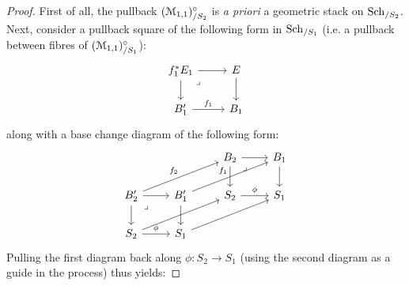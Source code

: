                     \begin{proof}
                        First of all, the pullback $(\mathcal{M}_{1, 1})_{/S_2}^{\circ}$ is \textit{a priori} a geometric stack on $\mathrm{Sch}_{/S_2}$. Next, consider a pullback square of the following form in $\mathrm{Sch}_{/S_1}$ (i.e. a pullback between fibres of $(\mathcal{M}_{1, 1})_{/S_1}^{\circ}$):
                            $$
                                \begin{tikzcd}
                                	{f_1^* E_1} & E \\
                                	{B_1'} & {B_1}
                                	\arrow["{f_1}", from=2-1, to=2-2]
                                	\arrow[from=1-2, to=2-2]
                                	\arrow[from=1-1, to=1-2]
                                	\arrow[from=1-1, to=2-1]
                                	\arrow["\lrcorner"{anchor=center, pos=0.125}, draw=none, from=1-1, to=2-2]
                                \end{tikzcd}
                            $$
                        along with a base change diagram of the following form:
                            $$
                                \begin{tikzcd}
                                	&& {B_2} & {B_1} \\
                                	{B_2'} & {B'_1} & {S_2} & {S_1} \\
                                	{S_2} & {S_1}
                                	\arrow["\phi", from=3-1, to=3-2]
                                	\arrow[from=2-2, to=3-2]
                                	\arrow[from=2-1, to=2-2]
                                	\arrow[from=2-1, to=3-1]
                                	\arrow["\lrcorner"{anchor=center, pos=0.125}, draw=none, from=2-1, to=3-2]
                                	\arrow["\phi", from=2-3, to=2-4]
                                	\arrow[from=3-2, to=2-4]
                                	\arrow[from=3-1, to=2-3]
                                	\arrow["{f_2}", from=2-1, to=1-3]
                                	\arrow["{f_1}", from=2-2, to=1-4]
                                	\arrow[from=1-3, to=1-4]
                                	\arrow[from=1-4, to=2-4]
                                	\arrow[from=1-3, to=2-3]
                                	\arrow["\lrcorner"{anchor=center, pos=0.125}, draw=none, from=1-3, to=2-4]
                                \end{tikzcd}
                            $$
                        Pulling the first diagram back along $\phi: S_2 \to S_1$ (using the second diagram as a guide in the process) thus yields:

\end{proof}
